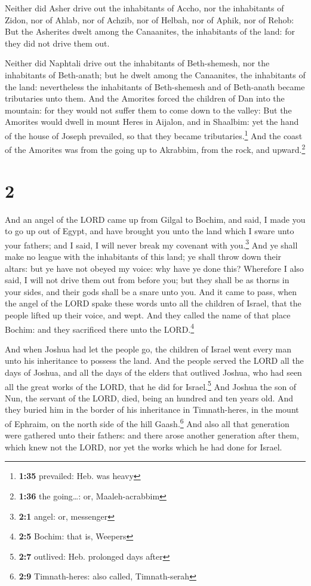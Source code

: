  Neither did Asher drive out the inhabitants of Accho,
nor the inhabitants of Zidon, nor of Ahlab, nor of Achzib, nor of
Helbah, nor of Aphik, nor of Rehob:  But the Asherites
dwelt among the Canaanites, the inhabitants of the land: for they did
not drive them out.

 Neither did Naphtali drive out the inhabitants of
Beth-shemesh, nor the inhabitants of Beth-anath; but he dwelt among the
Canaanites, the inhabitants of the land: nevertheless the inhabitants of
Beth-shemesh and of Beth-anath became tributaries unto them.
 And the Amorites forced the children of Dan into the
mountain: for they would not suffer them to come down to the valley:
 But the Amorites would dwell in mount Heres in Aijalon,
and in Shaalbim: yet the hand of the house of Joseph prevailed, so that
they became tributaries.\footnote{\textbf{1:35} prevailed: Heb. was
  heavy}  And the coast of the Amorites was from the
going up to Akrabbim, from the rock, and upward.\footnote{\textbf{1:36}
  the going\ldots: or, Maaleh-acrabbim}

\hypertarget{section-1}{%
\section{2}\label{section-1}}

 And an angel of the LORD came up from Gilgal to Bochim,
and said, I made you to go up out of Egypt, and have brought you unto
the land which I sware unto your fathers; and I said, I will never break
my covenant with you.\footnote{\textbf{2:1} angel: or, messenger}
 And ye shall make no league with the inhabitants of this
land; ye shall throw down their altars: but ye have not obeyed my voice:
why have ye done this?  Wherefore I also said, I will not
drive them out from before you; but they shall be as thorns in your
sides, and their gods shall be a snare unto you.  And it
came to pass, when the angel of the LORD spake these words unto all the
children of Israel, that the people lifted up their voice, and wept.
 And they called the name of that place Bochim: and they
sacrificed there unto the LORD.\footnote{\textbf{2:5} Bochim: that is,
  Weepers}

 And when Joshua had let the people go, the children of
Israel went every man unto his inheritance to possess the land.
 And the people served the LORD all the days of Joshua,
and all the days of the elders that outlived Joshua, who had seen all
the great works of the LORD, that he did for Israel.\footnote{\textbf{2:7}
  outlived: Heb. prolonged days after}  And Joshua the son
of Nun, the servant of the LORD, died, being an hundred and ten years
old.  And they buried him in the border of his inheritance
in Timnath-heres, in the mount of Ephraim, on the north side of the hill
Gaash.\footnote{\textbf{2:9} Timnath-heres: also called, Timnath-serah}
 And also all that generation were gathered unto their
fathers: and there arose another generation after them, which knew not
the LORD, nor yet the works which he had done for Israel.

